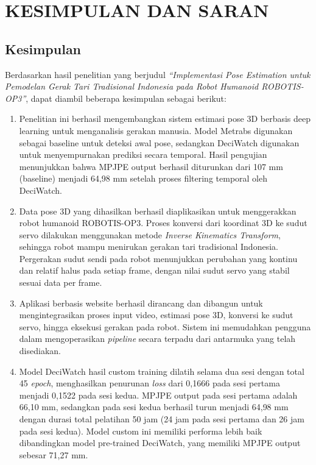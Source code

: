 \chapter{KESIMPULAN DAN SARAN}
\vspace{1em}

\section{Kesimpulan}
Berdasarkan hasil penelitian yang berjudul \textit{“Implementasi Pose Estimation untuk Pemodelan Gerak Tari Tradisional Indonesia pada Robot Humanoid ROBOTIS-OP3”}, dapat diambil beberapa kesimpulan sebagai berikut:

\begin{enumerate}
    \item Penelitian ini berhasil mengembangkan sistem estimasi pose 3D berbasis deep learning untuk menganalisis gerakan manusia. Model Metrabs digunakan sebagai baseline untuk deteksi awal pose, sedangkan DeciWatch digunakan untuk menyempurnakan prediksi secara temporal. Hasil pengujian menunjukkan bahwa MPJPE output berhasil diturunkan dari 107 mm (baseline) menjadi 64{,}98 mm setelah proses filtering temporal oleh DeciWatch.
    
    \item Data pose 3D yang dihasilkan berhasil diaplikasikan untuk menggerakkan robot humanoid ROBOTIS-OP3. Proses konversi dari koordinat 3D ke sudut servo dilakukan menggunakan metode \textit{Inverse Kinematics Transform}, sehingga robot mampu menirukan gerakan tari tradisional Indonesia. Pergerakan sudut sendi pada robot menunjukkan perubahan yang kontinu dan relatif halus pada setiap frame, dengan nilai sudut servo yang stabil sesuai data per frame.
    
    \item Aplikasi berbasis website berhasil dirancang dan dibangun untuk mengintegrasikan proses input video, estimasi pose 3D, konversi ke sudut servo, hingga eksekusi gerakan pada robot. Sistem ini memudahkan pengguna dalam mengoperasikan \textit{pipeline} secara terpadu dari antarmuka yang telah disediakan.
    
    \item Model DeciWatch hasil custom training dilatih selama dua sesi dengan total 45 \textit{epoch}, menghasilkan penurunan \textit{loss} dari 0{,}1666 pada sesi pertama menjadi 0{,}1522 pada sesi kedua. MPJPE output pada sesi pertama adalah 66{,}10 mm, sedangkan pada sesi kedua berhasil turun menjadi 64{,}98 mm dengan durasi total pelatihan 50 jam (24 jam pada sesi pertama dan 26 jam pada sesi kedua). Model custom ini memiliki performa lebih baik dibandingkan model pre-trained DeciWatch, yang memiliki MPJPE output sebesar 71{,}27 mm.
\end{enumerate}


